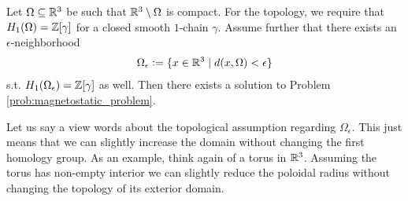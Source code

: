 \documentclass[../main.tex]{subfiles}
\begin{document}
\begin{theorem}\label{thm:existence}
    Let $\Omega \subseteq \mathbb{R}^3$ be such that $\mathbb{R}^3 \setminus \Omega$
    is compact. 
    For the topology, we require that $H_1(\Omega) = \mathbb{Z} [\gamma]$ 
    for a closed smooth $1$-chain 
    $\gamma$. Assume further that there exists an $\epsilon$-neighborhood 
    \begin{align*}
        \Omega_\epsilon \vcentcolon= \{ x \in \mathbb{R}^3 \mid
            d(x,\Omega) < \epsilon \} 
    \end{align*}
    s.t. $H_1(\Omega_\epsilon) = \mathbb{Z} [\gamma]$ as well.
    Then there exists a solution 
    to Problem \ref{prob:magnetostatic_problem}.
\end{theorem}
Let us say a view words about the topological assumption 
regarding $\Omega_\epsilon$. This just means that we can slightly increase 
the domain without changing the first homology group. As an example, 
think again of a torus in $\mathbb{R}^3$. Assuming the torus has non-empty interior 
we can slightly reduce the poloidal radius without changing the topology of its 
 exterior domain.
\end{document}
